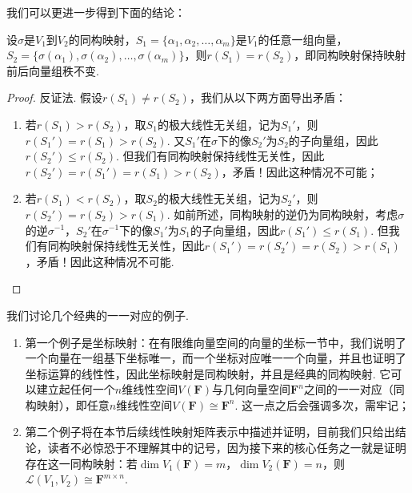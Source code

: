 \begin{enumerate}
          我们可以更进一步得到下面的结论：
          \begin{theorem}\label{thm:6:同构保秩}
              设$\sigma$是$V_1$到$V_2$的同构映射，$S_1=\{\alpha_1,\alpha_2,\ldots,\alpha_m\}$是$V_1$的任意一组向量，$S_2=\{\sigma(\alpha_1),\sigma(\alpha_2),\ldots,\sigma(\alpha_m)\}$，则$r(S_1)=r(S_2)$，即同构映射保持映射前后向量组秩不变.
          \end{theorem}
          \begin{proof}
              反证法. 假设$r(S_1)\neq r(S_2)$，我们从以下两方面导出矛盾：
              \begin{enumerate}
                  \item 若$r(S_1)>r(S_2)$，取$S_1$的极大线性无关组，记为$S_1'$，则$r(S_1')=r(S_1)>r(S_2)$. 又$S_1'$在$\sigma$下的像$S_2'$为$S_2$的子向量组，因此$r(S_2')\leqslant r(S_2)$. 但我们有同构映射保持线性无关性，因此$r(S_2')=r(S_1')=r(S_1)>r(S_2)$，矛盾！因此这种情况不可能；

                  \item 若$r(S_1)<r(S_2)$，取$S_2$的极大线性无关组，记为$S_2'$，则$r(S_2')=r(S_2)>r(S_1)$. 如前所述，同构映射的逆仍为同构映射，考虑$\sigma$的逆$\sigma^{-1}$，$S_2'$在$\sigma^{-1}$下的像$S_1'$为$S_1$的子向量组，因此$r(S_1')\leqslant r(S_1)$. 但我们有同构映射保持线性无关性，因此$r(S_1')=r(S_2')=r(S_2)>r(S_1)$，矛盾！因此这种情况不可能.
              \end{enumerate}
          \end{proof}
\end{enumerate}

我们讨论几个经典的一一对应的例子.
\begin{enumerate}
    \item 第一个例子是坐标映射：在有限维向量空间的向量的坐标一节中，我们说明了一个向量在一组基下坐标唯一，而一个坐标对应唯一一个向量，并且也证明了坐标运算的线性性，因此坐标映射是同构映射，并且是经典的同构映射. 它可以建立起任何一个$n$维线性空间$V(\mathbf{F})$与几何向量空间$\mathbf{F}^n$之间的一一对应（同构映射），即任意$n$维线性空间$V(\mathbf{F})\cong\mathbf{F}^n$. 这一点之后会强调多次，需牢记；

    \item 第二个例子将在本节后续线性映射矩阵表示中描述并证明，目前我们只给出结论，读者不必惊恐于不理解其中的记号，因为接下来的核心任务之一就是证明存在这一同构映射：若$\dim V_1(\mathbf{F})=m$，$\dim V_2(\mathbf{F})=n$，则$\mathcal{L}(V_1,V_2) \cong \mathbf{F}^{m \times n}$.
\end{enumerate}

